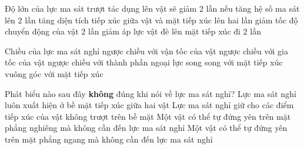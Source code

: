 \begin{ex}%
Độ lớn của lực ma sát trượt tác dụng lên vật sẽ giảm $2$ lần nếu
\choice
{tăng hệ số ma sát lên $2$ lần}
{tăng diện tích tiếp xúc giữa vật và mặt tiếp xúc lên hai lần}
{giảm tốc độ chuyển động của vật $2$ lần}
{\True giảm áp lực vật đè lên mặt tiếp xúc đi $2$ lần}
\end{ex}
\begin{ex}%
Chiều của lực ma sát nghỉ
\choice
{ngược chiều với vận tốc của vật}
{ngược chiều với gia tốc của vật}
{\True ngược chiều với thành phần ngoại lực song song với mặt tiếp xúc}
{vuông góc với mặt tiếp xúc}
 \end{ex}
\begin{ex}%
Phát biểu nào sau đây \textbf{không} đúng khi nói về lực ma sát nghỉ?
\choice
{Lực ma sát nghỉ luôn xuất hiện ở bề mặt tiếp xúc giữa hai vật}
{Lực ma sát nghỉ giữ cho các điểm tiếp xúc của vật không trượt trên bề mặt}
{\True Một vật có thể tự đứng yên trên mặt phẳng nghiêng mà không cần đến lực ma sát nghỉ}
{Một vật có thể tự đứng yên trên mặt phẳng ngang mà không cần đến lực ma sát nghỉ}
 \end{ex}

